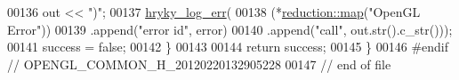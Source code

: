 \begin{DoxyCode}
00136         out << \textcolor{stringliteral}{")"};
00137         \hyperlink{log__writer__common_8h_ae5ad3dabb33f594695ef40753cb78aad}{hryky_log_err}(
00138             (*\hyperlink{namespacehryky_1_1reduction_ac5eae270cf8047b294dc4ff3e5e11a79}{reduction::map}(\textcolor{stringliteral}{"OpenGL Error"}))
00139             .append(\textcolor{stringliteral}{"error id"},     error)
00140             .append(\textcolor{stringliteral}{"call"},         out.str().c\_str()));
00141         success = \textcolor{keyword}{false};
00142     \}
00143 
00144     \textcolor{keywordflow}{return} success;
00145 \}
00146 \textcolor{preprocessor}{#endif // OPENGL\_COMMON\_H\_20120220132905228}
00147 \textcolor{preprocessor}{}\textcolor{comment}{// end of file}
\end{DoxyCode}
